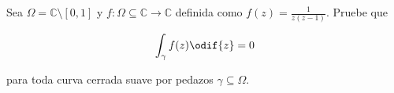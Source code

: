 \documentclass[../main.tex]{subfiles}
\begin{document}
\begin{problema}
    Sea \(\Omega = \mathbb{C}\setminus [0, 1]\) y \(f \colon \Omega \subseteq
    \mathbb{C} \to \mathbb{C}\) definida como \(f(z) = \tfrac{1}{z(z - 1)}\). Pruebe que

    \begin{equation*}
        \int_{\gamma}^{}f(z)\odif{z} = 0
    \end{equation*}

    para toda curva cerrada suave por pedazos \(\gamma \subseteq \Omega\).
\end{problema}
\end{document}
